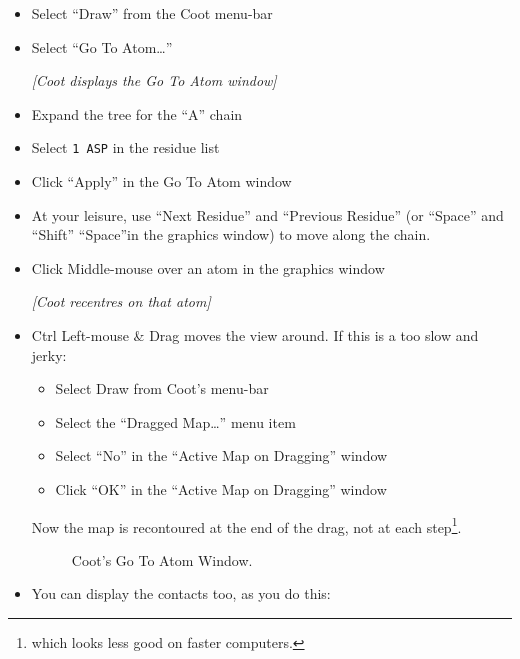 \documentclass{article}
\begin{document}
\begin{itemize}
\item Select \textsf{``Draw''} from the Coot menu-bar
\item Select \textsf{``Go To Atom\ldots''}

\textsl{  [Coot displays the Go To Atom window]}

\item Expand the tree for the ``A'' chain
\item Select \texttt{1 ASP} in the residue list
\item Click \textsf{``Apply''} in the Go To Atom window
  
\item At your leisure, use \textsf{``Next Residue''} and
  \textsf{``Previous Residue''} (or ``Space'' and ``Shift''
  ``Space''in the graphics window) to move along the chain.


\item Click Middle-mouse over an atom in the graphics window

\textsl{[Coot recentres on that atom]}

\item Ctrl Left-mouse \& Drag moves the view around.  If this is a too
  slow and jerky:
  \begin{itemize}
  \item Select \textsf{Draw} from Coot's menu-bar
  \item Select the \textsf{``Dragged Map\ldots''} menu item
  \item Select \textsf{``No''} in the ``Active Map on Dragging'' window
  \item Click \textsf{``OK''} in the ``Active Map on Dragging'' window
  \end{itemize}
  Now the map is recontoured at the end of the drag, not at each
  step\footnote{which looks less good on faster computers.}.


\begin{figure}[htbp]
  \begin{center}
    \leavevmode
    \epsfxsize 70mm
    \caption{Coot's Go To Atom Window.}
    \label{fig:goto-atom}
  \end{center}
\end{figure}

\item You can display the contacts too, as you do this:


\end{itemize}
\end{document}
